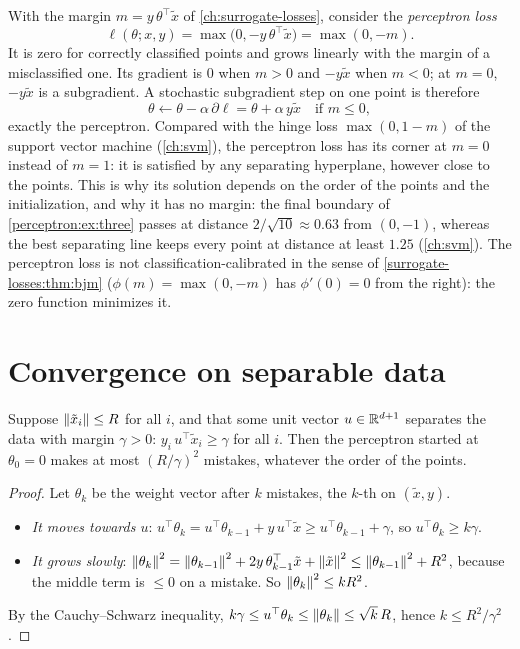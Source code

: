 \begin{notechapter}
With the margin $m = y\,\theta^\top\tilde x$ of \cref{ch:surrogate-losses}, consider the \emph{perceptron loss}
\[
  \ell(\theta; x, y) = \max\bigl(0, -y\,\theta^\top\tilde x\bigr) = \max(0, -m).
\]
It is zero for correctly classified points and grows linearly with the margin of a
misclassified one. Its gradient is $0$ when $m>0$ and $-y\tilde x$ when $m<0$; at $m = 0$, $-y\tilde x$ is a
subgradient. A stochastic subgradient step on one point is therefore
\[
  \theta\leftarrow\theta - \alpha\,\partial\ell = \theta + \alpha\,y\tilde x\quad\text{if }m\leq0,
\]
exactly the perceptron. Compared with the hinge loss $\max(0, 1 - m)$ of the support vector
machine (\cref{ch:svm}), the perceptron loss has its corner at $m = 0$ instead of $m = 1$: it is
satisfied by any separating hyperplane, however close to the points. This is why its
solution depends on the order of the points and the initialization, and why it has
no margin: the final boundary of \cref{perceptron:ex:three} passes at distance
$2/\sqrt{10}\approx0.63$ from $(0, -1)$, whereas the best separating line keeps every point at distance at
least $1.25$ (\cref{ch:svm}). The
perceptron loss is not classification-calibrated in the sense of
\cref{surrogate-losses:thm:bjm} ($\phi(m) = \max(0, -m)$ has $\phi'(0) = 0$ from the right): the zero
function minimizes it.

\section{Convergence on separable data}\label{perceptron:sec:convergence}

\begin{theorem}[Novikoff, 1962]\label{perceptron:thm:novikoff}
Suppose $\left\|\tilde x_i\right\|\leq R$ for all $i$, and that some unit vector $u\in\mathbb{R}^{d+1}$ separates the data with
margin $\gamma>0$: $y_i\,u^\top\tilde x_i\geq\gamma$ for all $i$. Then the perceptron started at $\theta_0 = 0$ makes at most
$(R/\gamma)^2$ mistakes, whatever the order of the points.
\end{theorem}

\begin{proof}
Let $\theta_k$ be the weight vector after $k$ mistakes, the $k$-th on $(\tilde x, y)$.
\begin{itemize}[nosep]
  \item \emph{It moves towards $u$}: $u^\top\theta_k = u^\top\theta_{k-1} + y\,u^\top\tilde x\geq u^\top\theta_{k-1} + \gamma$, so $u^\top\theta_k\geq k\gamma$.
  \item \emph{It grows slowly}: $\left\|\theta_k\right\|^2 = \left\|\theta_{k-1}\right\|^2 + 2y\,\theta_{k-1}^\top\tilde x + \left\|\tilde x\right\|^2\leq\left\|\theta_{k-1}\right\|^2 + R^2$, because the
        middle term is $\leq0$ on a mistake. So $\left\|\theta_k\right\|^2\leq kR^2$.
\end{itemize}
By the Cauchy--Schwarz inequality, $k\gamma\leq u^\top\theta_k\leq\left\|\theta_k\right\|\leq\sqrt k\,R$, hence $k\leq R^2/\gamma^2$.
\end{proof}


\end{notechapter}
